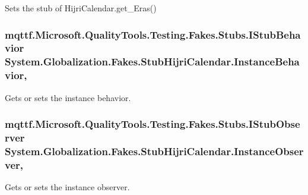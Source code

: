 Sets the stub of Hijri\-Calendar.\-get\-\_\-\-Eras()

\hypertarget{class_system_1_1_globalization_1_1_fakes_1_1_stub_hijri_calendar_ad74697ec06a3d68a512d434d7598f475}{
\subsubsection[{Instance\-Behavior}]{\setlength{\rightskip}{0pt plus 5cm}mqttf.\-Microsoft.\-Quality\-Tools.\-Testing.\-Fakes.\-Stubs.\-I\-Stub\-Behavior System.\-Globalization.\-Fakes.\-Stub\-Hijri\-Calendar.\-Instance\-Behavior\hspace{0.3cm}{\ttfamily [get]}, {\ttfamily [set]}}}\label{class_system_1_1_globalization_1_1_fakes_1_1_stub_hijri_calendar_ad74697ec06a3d68a512d434d7598f475}


Gets or sets the instance behavior.

\hypertarget{class_system_1_1_globalization_1_1_fakes_1_1_stub_hijri_calendar_a2c226c48a9b1f060f11f168334775f19}{
\subsubsection[{Instance\-Observer}]{\setlength{\rightskip}{0pt plus 5cm}mqttf.\-Microsoft.\-Quality\-Tools.\-Testing.\-Fakes.\-Stubs.\-I\-Stub\-Observer System.\-Globalization.\-Fakes.\-Stub\-Hijri\-Calendar.\-Instance\-Observer\hspace{0.3cm}{\ttfamily [get]}, {\ttfamily [set]}}}\label{class_system_1_1_globalization_1_1_fakes_1_1_stub_hijri_calendar_a2c226c48a9b1f060f11f168334775f19}


Gets or sets the instance observer.

